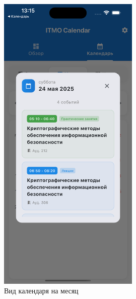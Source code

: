 \begin{figure}[h!]
    \centering
    \includegraphics[width=0.6\textwidth]{images/calendar-month.png}
    \caption{Вид календаря на месяц}
    \label{fig:calendar-month}
\end{figure}

